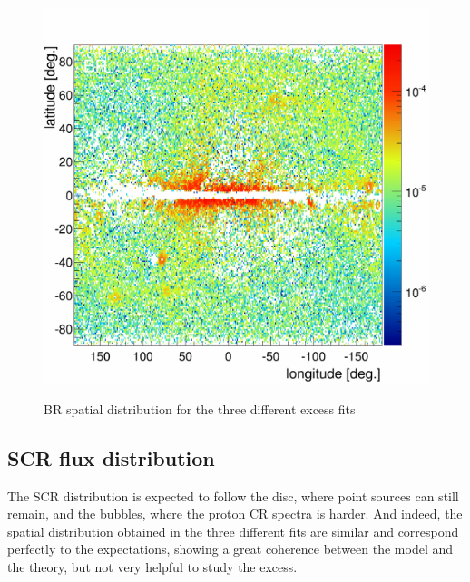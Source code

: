 \begin{figure}[h]
\begin{minipage}[h]{0.3\textwidth}
	  \label{}
  \end{minipage}
  \hfill
  \begin{minipage}[h]{0.3\textwidth}
	  \centering
	  \includegraphics[width=1.\linewidth]{pic/discussion/MSPonly_fine_BR_integral_distribution.png}
	  \label{}
  \end{minipage}
  \caption{BR spatial distribution for the three different excess fits}
  \label{fig:BR_flux_distrib_excess_comp}	 
\end{figure}

\subsection{SCR flux distribution}
The SCR distribution is expected to follow the disc, where point sources can still remain, and the bubbles, where the proton CR spectra is harder. And indeed, the spatial distribution obtained in the three  different fits are similar and correspond perfectly to the expectations, showing a great coherence between the model and the theory, but not very helpful to study the excess.


